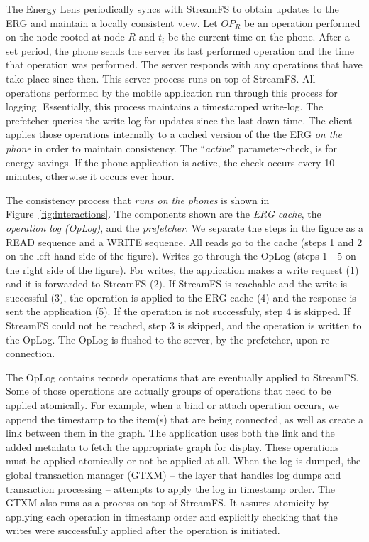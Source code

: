 The Energy Lens periodically syncs with StreamFS to obtain updates to the ERG and maintain a locally consistent view.  
Let $OP_R$ be an operation performed on the node rooted at node $R$ and $t_i$ be the current time on the phone.  
After a set period, the phone sends the server
its last performed operation and the time that operation was performed.  The server responds with any operations that have
take place since then.  This server process runs on top of StreamFS.  All operations performed by the mobile application
run through this process for logging.  Essentially, this process maintains a timestamped write-log.  The prefetcher
queries the write log for updates since the last down time.
The client applies those operations internally to a cached version of the the ERG \emph{on the phone} in order to 
maintain consistency.  The ``\emph{active}'' parameter-check, is for energy savings.  If the phone application is active, the
check occurs every 10 minutes, otherwise it occurs ever hour.

The consistency process that \emph{runs on the phones} is shown in Figure~\ref{fig:interactions}.  The components shown 
are the \emph{ERG cache}, the \emph{operation
log (OpLog)}, and the \emph{prefetcher}.  We separate the steps in the figure as a READ sequence and a WRITE sequence.
All reads go to the cache (steps 1 and 2 on the left hand side of the figure).  Writes go through the OpLog (steps 1 - 5 on the right
side of the figure).  For writes, 
the application makes a write request (1) and it is forwarded to StreamFS (2).  If StreamFS is reachable and the write is
successful (3), the operation is applied to the ERG cache (4) and the response is sent the application (5).
If the operation is not successfuly, step 4 is skipped.  If StreamFS could not be reached, step 3 is skipped, and the operation
is written to the OpLog.  The OpLog is flushed to the server, by the prefetcher, upon re-connection. 

The OpLog contains records operations that are eventually applied to StreamFS.  Some of those operations
are actually groups of operations that need to be applied atomically.  For example, 
when a bind or attach operation occurs, we append the timestamp to the item(s) that are being connected, as well as create
a link between them in the graph.  The application uses both the link and the added metadata to fetch the appropriate
graph for display.  These operations must be applied atomically or not be applied at all.
When the log is dumped, the global transaction manager (GTXM) -- the layer that handles log dumps and transaction processing --
attempts to apply the log in timestamp order.  The GTXM also runs as a process on top of StreamFS.  It assures atomicity
by applying each operation in timestamp order and explicitly checking that the writes were successfully applied after 
the operation is initiated.


